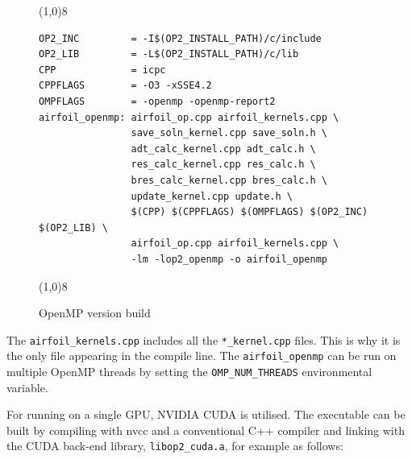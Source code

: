 \documentclass[11pt]{article}
\begin{document}
\begin{figure}[!h]\small
\vspace{-0pt}\noindent\line(1,0){8}\vspace{-10pt}
\begin{lstlisting}
OP2_INC         = -I$(OP2_INSTALL_PATH)/c/include
OP2_LIB         = -L$(OP2_INSTALL_PATH)/c/lib
CPP             = icpc
CPPFLAGS        = -O3 -xSSE4.2 
OMPFLAGS        = -openmp -openmp-report2
airfoil_openmp:	airfoil_op.cpp airfoil_kernels.cpp \
                save_soln_kernel.cpp save_soln.h \
                adt_calc_kernel.cpp adt_calc.h \
                res_calc_kernel.cpp res_calc.h \
                bres_calc_kernel.cpp bres_calc.h \
                update_kernel.cpp update.h \
                $(CPP) $(CPPFLAGS) $(OMPFLAGS) $(OP2_INC) $(OP2_LIB) \
                airfoil_op.cpp airfoil_kernels.cpp \
                -lm -lop2_openmp -o airfoil_openmp
\end{lstlisting}\vspace{-10pt}
\vspace{-0pt}\noindent\line(1,0){8}\vspace{-10pt}
\caption{\small OpenMP version build }
\normalsize\vspace{-10pt}\label{fig:ompbuild}
\end{figure}


\noindent The \texttt{airfoil\_kernels.cpp} includes all the \texttt{*\_kernel.cpp} files. This is why it is the only
file appearing in the compile line. The \texttt{airfoil\_openmp} can be run on multiple OpenMP threads by setting the
\texttt{OMP\_NUM\_THREADS} environmental variable.\newpage

\noindent For running on a single GPU, NVIDIA CUDA is utilised. The executable can be built by compiling with nvcc and a
conventional C++ compiler and linking with the CUDA back-end library, \texttt{libop2\_cuda.a}, for example as follows:
\end{document}
